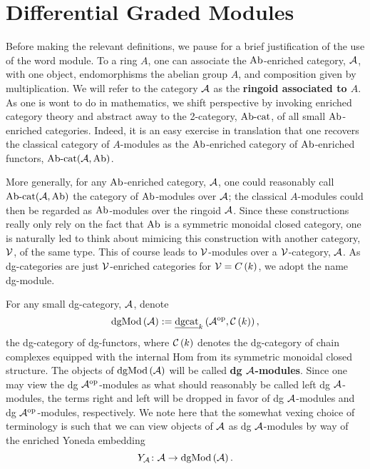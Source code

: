 \section{Differential Graded Modules}\label{subsection: dg modules}
Before making the relevant definitions, we pause for a brief justification of the use of the word module.
To a ring $A$, one can associate the $\operatorname{Ab}$-enriched category, \(\mathcal{A}\), with one object, endomorphisms the abelian group $A$, and composition given by multiplication.
We will refer to the category $\mathcal{A}$ as the \textbf{ringoid associated to $A$}.
As one is wont to do in mathematics, we shift perspective by invoking enriched category theory and abstract away to the 2-category, $\operatorname{Ab-cat}$, of all small $\operatorname{Ab}$-enriched categories.
Indeed, it is an easy exercise in translation that one recovers the classical category of $A$-modules as the $\operatorname{Ab}$-enriched category of $\operatorname{Ab}$-enriched functors, $\operatorname{Ab-cat}(\mathcal{A}, \operatorname{Ab})$.

More generally, for any $\operatorname{Ab}$-enriched category, $\mathcal{A}$, one could reasonably call $\operatorname{Ab-cat}(\mathcal{A},\operatorname{Ab})$ the category of $\operatorname{Ab}$-modules over $\mathcal{A}$; the classical $A$-modules could then be regarded as $\operatorname{Ab}$-modules over the ringoid $\mathcal{A}$.
Since these constructions really only rely on the fact that $\operatorname{Ab}$ is a symmetric monoidal closed category, one is naturally led to think about mimicing this construction with another category, $\mathcal{V}$, of the same type.
This of course leads to $\mathcal{V}$-modules over a $\mathcal{V}$-category, $\mathcal{A}$.
As dg-categories are just $\mathcal{V}$-enriched categories for $\mathcal{V} = C\left(k\right)$, we adopt the name dg-module.

For any small dg-category, \(\mathcal{A}\), denote
\[\operatorname{dgMod}\left(\mathcal{A}\right) := \underline{\operatorname{dgcat}}_{k}\left(\mathcal{A}^{{\operatorname{op}}},\mathcal{C}\left(k\right)\right),\]
the dg-category of dg-functors, where \(\mathcal{C}\left(k\right)\) denotes the dg-category of chain complexes equipped with the internal Hom from its symmetric monoidal closed structure.
The objects of \(\operatorname{dgMod}\left(\mathcal{A}\right)\) will be called \textbf{dg \(\mathcal{A}\)-modules}.
Since one may view the dg \(\mathcal{A}^{{\operatorname{op}}}\)-modules as what should reasonably be called left dg \(\mathcal{A}\)-modules, the terms right and left will be dropped in favor of dg \(\mathcal{A}\)-modules and dg \(\mathcal{A}^{{\operatorname{op}}}\)-modules, respectively.
We note here that the somewhat vexing choice of terminology is such that we can view objects of \(\mathcal{A}\) as dg \(\mathcal{A}\)-modules by way of the enriched Yoneda embedding
\[Y_{\mathcal{A}} \colon \mathcal{A} \to \operatorname{dgMod}\left(\mathcal{A}\right).\]

